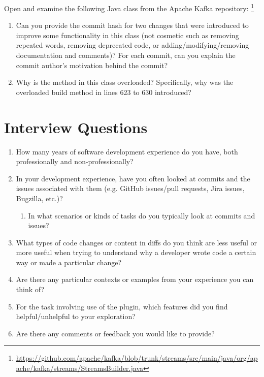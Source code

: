 Open and examine the following Java class from the Apache Kafka repository:
\footnote{\url{https://github.com/apache/kafka/blob/trunk/streams/src/main/java/org/apache/kafka/streams/StreamsBuilder.java}}

\begin{enumerate}
    \item Can you provide the commit hash for two changes that were introduced to improve some functionality in this class (\ie not cosmetic such as removing repeated words, removing deprecated code, or adding/modifying/removing documentation and comments)? For each commit, can you explain the commit author’s motivation behind the commit?
    \item Why is the  method in this class overloaded? Specifically, why was the overloaded build method in lines 623 to 630 introduced?
\end{enumerate}

\section{Interview Questions}
\label{sec:Interview-Questions}

\begin{enumerate}
    \item How many years of software development experience do you have, both professionally and non-professionally?
    \item In your development experience, have you often looked at commits and the issues associated with them (e.g. GitHub issues/pull requests, Jira issues, Bugzilla, etc.)?
        \begin{enumerate}
            \item In what scenarios or kinds of tasks do you typically look at commits and issues?
        \end{enumerate}
    \item What types of code changes or content in diffs do you think are less useful or more useful when trying to understand why a developer wrote code a certain way or made a particular change? 
    \item Are there any particular contexts or examples from your experience you can think of?
    \item For the task involving use of the plugin, which features did you find helpful/unhelpful to your exploration?
    \item Are there any comments or feedback you would like to provide?
\end{enumerate}

\endinput

This would be any supporting material not central to the dissertation.
For example:
\begin{itemize}
\item additional details of methodology and/or data;
\item diagrams of specialized equipment developed.;
\item copies of questionnaires and survey instruments.
\end{itemize}